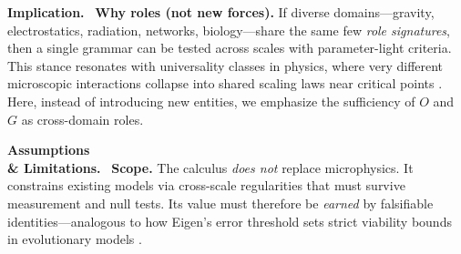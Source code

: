 \documentclass[12pt,a4paper,oneside]{scrreprt}
\newenvironment{implication}{\par\vspace{0.5em}\noindent\textbf{Implication.}\ }{\par\vspace{0.5em}}
\newenvironment{limitation}{\par\vspace{0.5em}\noindent\textbf{Assumptions \\ \& Limitations.}\ }{\par\vspace{0.5em}}
\begin{document}
\begin{implication}
\textbf{Why roles (not new forces).} 
If diverse domains---gravity, electrostatics, radiation, networks, biology---share the same few 
\emph{role signatures}, then a single grammar can be tested across scales with parameter-light criteria. 
This stance resonates with universality classes in physics, where very different microscopic 
interactions collapse into shared scaling laws near critical points \citep{Wilson1971RG,Kadanoff1966}. 
Here, instead of introducing new entities, we emphasize the sufficiency of $O$ and $G$ as cross-domain roles.
\end{implication}

\begin{limitation}
\textbf{Scope.} 
The calculus \emph{does not} replace microphysics. 
It constrains existing models via cross-scale regularities that must survive 
measurement and null tests. 
Its value must therefore be \emph{earned} by falsifiable identities---analogous 
to how Eigen's error threshold sets strict viability bounds in evolutionary models 
\citep{Eigen1971,Szathmary1995}.
\end{limitation}
\end{document}
